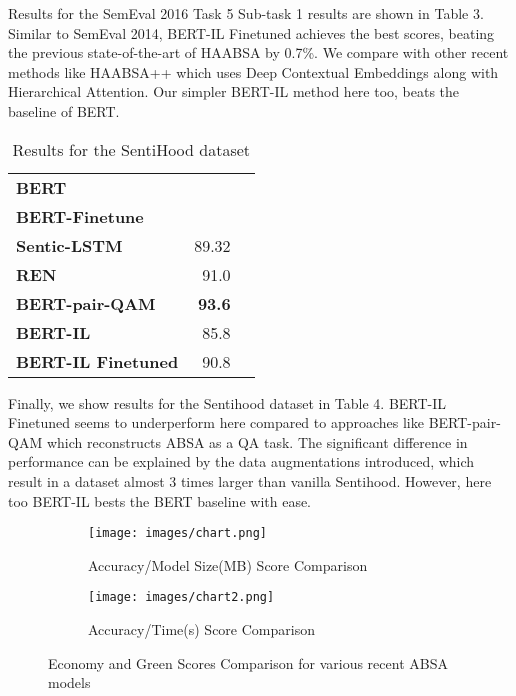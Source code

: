 \documentclass[11pt,a4paper]{article}
\begin{document}
Results for the SemEval 2016 Task 5 Sub-task 1 results are shown in Table 3. Similar to SemEval 2014, BERT-IL Finetuned achieves the best scores, beating the previous state-of-the-art of HAABSA \cite{inbook} by 0.7\%. We compare with other recent methods like HAABSA++ \cite{trusca2020hybrid} which uses Deep Contextual Embeddings along with Hierarchical Attention. Our simpler BERT-IL method here too, beats the baseline of BERT. 

\begin{table}[!htp]\centering
\large
\begin{tabular}{lrr}\toprule
\textbf{BERT} & \\
\textbf{BERT-Finetune} & \\
\textbf{Sentic-LSTM} &89.32 \\
\textbf{REN} &91.0 \\
\textbf{BERT-pair-QAM} &\textbf{93.6} \\
\textbf{BERT-IL} &85.8 \\
\textbf{BERT-IL Finetuned} &90.8 \\
\bottomrule
\end{tabular}
\caption{Results for the SentiHood dataset}\label{tab: }
\end{table}

Finally, we show results for the Sentihood dataset in Table 4. BERT-IL Finetuned seems to underperform here compared to approaches like BERT-pair-QAM \cite{sun2019utilizing} which reconstructs ABSA as a QA task. The significant difference in performance can be explained by the data augmentations introduced, which result in a dataset almost 3 times larger than vanilla Sentihood. However, here too BERT-IL bests the BERT baseline with ease.  
\begin{figure*}[h]

\begin{subfigure}{0.5\textwidth}
\texttt{[image: images/chart.png]} 
\caption{Accuracy/Model Size(MB) Score Comparison}
\label{fig:chart}
\end{subfigure}
\begin{subfigure}{0.5\textwidth}
\texttt{[image: images/chart2.png]}
\caption{Accuracy/Time(s) Score Comparison}
\label{fig:subim2}
\end{subfigure}

\caption{Economy and Green Scores Comparison for various recent ABSA models}
\label{fig:image2}
\end{figure*}
\end{document}
